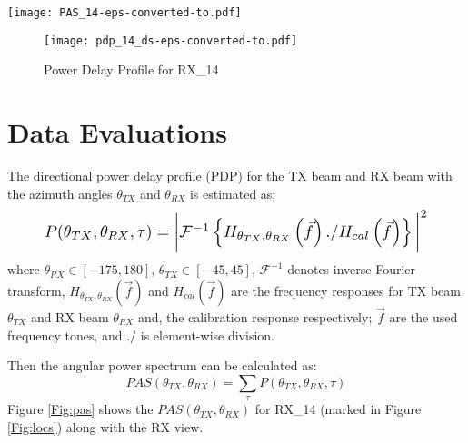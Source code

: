 \documentclass[conference]{IEEEtran}
\begin{document}
\begin{figure*}[htbp]\centering
  \texttt{[image: PAS\_14-eps-converted-to.pdf]}\caption{Power-Angular Spectrum for RX\_14}\label{Fig:pas}
\end{figure*}


\begin{figure}[tbp]\centering
  \texttt{[image: pdp\_14\_ds-eps-converted-to.pdf]}\caption{Power Delay Profile  for RX\_14}\label{Fig:pdp_14}
\end{figure}



\section{Data Evaluations} \label{sec:data}

The directional power delay profile (PDP) for the TX beam and RX beam with the azimuth angles  $\theta_{TX}$  and  $\theta_{RX}$  is estimated as;
\begin{equation}
  \resizebox{.9 \linewidth}{!} 
{
$   P(\theta_{TX},\theta_{RX},\tau) = \bigg\vert \mathcal{F}^{-1} \left\{ H_{\theta_{TX},\theta_{RX}}\left(\vec{f} \right) ./ H_{cal}\left(\vec{f} \right) \right\} \bigg\vert ^2$
}
\end{equation}
where $\theta_{RX}\in[-175,180]$,  $\theta_{TX}\in[-45,45]$, $\mathcal{F}^{-1}$ denotes inverse Fourier transform, $H_{\theta_{TX},\theta_{RX}}(\vec{f})$ and $H_{cal}(\vec{f})$ are the frequency responses for TX beam $\theta_{TX}$ and RX beam $\theta_{RX}$ and, the calibration response respectively; $\vec{f}$ are the used frequency tones, and $./$ is element-wise division. 

Then the angular power spectrum can be calculated as:
\begin{equation}
 {\displaystyle  PAS(\theta_{TX},\theta_{RX}) = \sum_{\tau} P(\theta_{TX},\theta_{RX},\tau)}
\end{equation}
Figure \ref{Fig:pas} shows the $PAS(\theta_{TX},\theta_{RX})$ for RX\_14 (marked in Figure \ref{Fig:locs}) along with the RX view.
\end{document}
